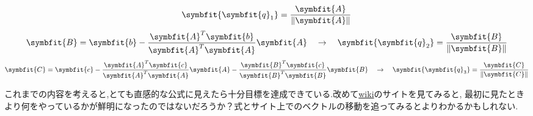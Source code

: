 \hypertarget{Gram}{}
\begin{tcolorbox}[colframe=black!80,colback=white,title=グラム--シュミットの正規直交化法]
\[\symbfit{\symbfit{q}_1}=\displaystyle\frac{\symbfit{A}}{\|\symbfit{A}\|}\]
\[\symbfit{B}=\symbfit{b}-\displaystyle\frac{\symbfit{A}^T\symbfit{b}}{\symbfit{A}^T\symbfit{A}}\symbfit{A}\quad \rightarrow \quad \symbfit{\symbfit{q}_2}=\displaystyle\frac{\symbfit{B}}{\|\symbfit{B}\|}\]
\[\symbfit{C}=\symbfit{c}-
\displaystyle\frac{\symbfit{A}^T\symbfit{c}}{\symbfit{A}^T\symbfit{A}}\symbfit{A}-
\displaystyle\frac{\symbfit{B}^T\symbfit{c}}{\symbfit{B}^T\symbfit{B}}\symbfit{B}\quad \rightarrow \quad \symbfit{\symbfit{q}_3}=\displaystyle\frac{\symbfit{C}}{\|\symbfit{C}\|}\]
\end{tcolorbox}
これまでの内容を考えると,とても直感的な公式に見えたら十分目標を達成できている.改めて\hyperlink{wiki}{wiki}のサイトを見てみると,
最初に見たときより何をやっているかが鮮明になったのではないだろうか？式とサイト上でのベクトルの移動を追ってみるとよりわかるかもしれない.

